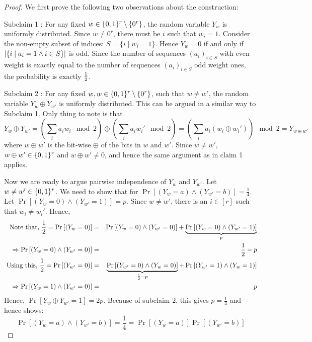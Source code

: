 \begin{proof}
\noindent We first prove the following two observations about the construction:
\begin{description}
\item{{\sf Subclaim 1 }: For any fixed $w \in \{0,1\}^r \setminus \{0^r\}$, the random variable $Y_w$ is uniformly distributed.}
Since $w \ne 0^r$, there must be $i$ such that $w_i = 1$. Consider the non-empty subset of indices: $S = \{ i \mid w_i=1\}$. Hence $Y_w = 0$ if and only if $\left|\{ i \mid a_i = 1 \land i \in S \} \right|$ is odd. Since the number of sequences $(a_i)_{i \in S}$ with even weight is exactly equal to the number of sequences $(a_i)_{i \in S}$ odd weight ones, the probability is exactly $\frac{1}{2}$.
\item{{\sf Subclaim 2 }: For any fixed $w, w
 \in \{0,1\}^r \setminus \{0^r\}$, such that $w \ne w'$, the random variable $Y_{w} \oplus Y_{w'}$ is uniformly distributed.}
 This can be argued in a similar way to Subclaim 1. Only thing to note is that 
$$Y_{w} \oplus Y_{w'} = \left( \sum_i a_iw_i \mod 2\right) \oplus \left( \sum_i a_iw_i' \mod 2\right) = \left( \sum_i a_i (w_i \oplus w_i') \right)\mod 2 = Y_{w \oplus w'}$$
where $w \oplus w'$ is the bit-wise $\oplus$ of the bits in $w$ and $w'$.
Since $w \ne w'$, $w \oplus w' \in \{0,1\}^r$ and $w \oplus w' \ne 0$, and hence the same argument as in claim 1 applies.
\end{description}
Now we are ready to argue pairwise independence of $Y_w$ and $Y_{w'}$. Let $w \ne w' \in \{0,1\}^r$. We need to show that for $\Pr\left[(Y_w = a) \land (Y_{w'} = b)\right] = \frac{1}{4}$. Let $\Pr\left[(Y_w = 0) \land (Y_{w'} = 1)\right] = p$. Since $w \ne w'$, there is an $i \in[r]$ such that $w_i \ne w_i'$. Hence, 
\begin{eqnarray*}
\text{ Note that, } \frac{1}{2} = \Pr\left[(Y_w = 0)\right] & = & \Pr\left[(Y_w = 0) \land (Y_{w'}=0)\right]+\underbrace{\Pr\left[(Y_w = 0) \land (Y_{w'}=1)\right]}_\text{$p$} \\
\Rightarrow \Pr\left[(Y_w = 0) \land (Y_{w'}=0)\right] & = & \frac{1}{2}-p  \\
\text{ Using this, }\frac{1}{2} = \Pr\left[(Y_{w'} = 0)\right] & = & \underbrace{\Pr\left[(Y_{w'} = 0) \land (Y_{w}=0)\right]}_{\frac{1}{2}-p}+\Pr\left[(Y_{w'} = 1) \land (Y_w=1)\right] \\
\Rightarrow \Pr\left[(Y_w = 1) \land (Y_{w'}=0)\right] & = & p 
\end{eqnarray*}
Hence, $\Pr\left[ Y_{w} \oplus Y_{w'} = 1\right] = 2p$. Because of subclaim 2, this gives $p = \frac{1}{4}$ and hence shows: 
$$\Pr\left[(Y_w = a) \land (Y_{w'} = b)\right] = \frac{1}{4} = \Pr\left[(Y_w = a)\right] \Pr \left[(Y_{w'} = b)\right]$$
\end{proof}

